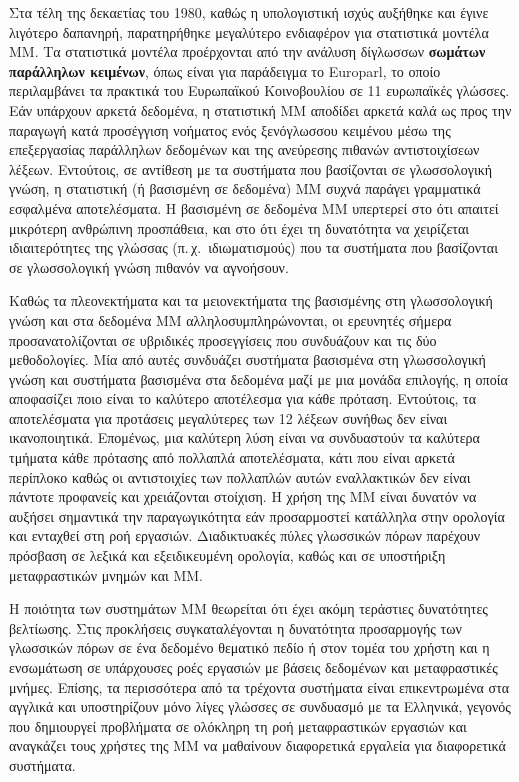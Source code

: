 \documentclass[]{../../metanetpaper}
\begin{document}
\begin{multicols}{2}
Στα τέλη της δεκαετίας του 1980, καθώς η υπολογιστική ισχύς αυξήθηκε και έγινε λιγότερο δαπανηρή, παρατηρήθηκε  μεγαλύτερο ενδιαφέρον για στατιστικά μοντέλα ΜΜ. Τα στατιστικά μοντέλα προέρχονται από την ανάλυση δίγλωσσων \textbf{σωμάτων παράλληλων κειμένων}, όπως είναι για παράδειγμα το Europarl, το οποίο περιλαμβάνει τα πρακτικά του Ευρωπαϊκού Κοινοβουλίου σε 11 ευρωπαϊκές γλώσσες. Εάν υπάρχουν αρκετά δεδομένα, η στατιστική MΜ αποδίδει αρκετά καλά ως προς την παραγωγή κατά προσέγγιση νοήματος ενός ξενόγλωσσου κειμένου μέσω της επεξεργασίας παράλληλων δεδομένων και της ανεύρεσης πιθανών αντιστοιχίσεων λέξεων. Εντούτοις, σε αντίθεση με τα συστήματα που βασίζονται σε γλωσσολογική γνώση, η στατιστική (ή βασισμένη σε δεδομένα) MΜ συχνά παράγει γραμματικά εσφαλμένα αποτελέσματα. Η βασισμένη σε δεδομένα ΜΜ υπερτερεί στο ότι απαιτεί μικρότερη ανθρώπινη προσπάθεια, και στο ότι έχει τη δυνατότητα να χειρίζεται ιδιαιτερότητες της γλώσσας (π.\,χ.~ιδιωματισμούς) που τα συστήματα που βασίζονται σε γλωσσολογική γνώση πιθανόν να αγνοήσουν.

Καθώς τα πλεονεκτήματα και τα μειονεκτήματα της βασισμένης στη γλωσσολογική γνώση και στα δεδομένα MΜ αλληλοσυμπληρώνονται, οι ερευνητές σήμερα προσανατολίζονται σε υβριδικές προσεγγίσεις που συνδυάζουν και τις δύο μεθοδολογίες. Μία από αυτές συνδυάζει συστήματα βασισμένα στη γλωσσολογική γνώση και συστήματα βασισμένα στα δεδομένα μαζί με μια μονάδα επιλογής, η οποία αποφασίζει ποιο είναι το καλύτερο αποτέλεσμα για κάθε πρόταση. Εντούτοις, τα αποτελέσματα για προτάσεις μεγαλύτερες των 12 λέξεων συνήθως δεν είναι ικανοποιητικά. Επομένως, μια καλύτερη λύση είναι να συνδυαστούν τα καλύτερα τμήματα κάθε πρότασης από πολλαπλά αποτελέσματα, κάτι που είναι αρκετά περίπλοκο καθώς οι αντιστοιχίες των πολλαπλών αυτών εναλλακτικών δεν είναι πάντοτε προφανείς και χρειάζονται στοίχιση. Η χρήση της ΜΜ είναι δυνατόν να αυξήσει σημαντικά την παραγωγικότητα εάν προσαρμοστεί κατάλληλα στην ορολογία και ενταχθεί στη ροή εργασιών. Διαδικτυακές πύλες γλωσσικών πόρων παρέχουν πρόσβαση σε λεξικά και εξειδικευμένη ορολογία, καθώς και σε υποστήριξη μεταφραστικών μνημών και ΜΜ. 

Η ποιότητα των συστημάτων MΜ θεωρείται ότι έχει ακόμη τεράστιες δυνατότητες βελτίωσης. Στις προκλήσεις συγκαταλέγονται η δυνατότητα προσαρμογής των γλωσσικών πόρων σε ένα δεδομένο θεματικό πεδίο ή στον τομέα του χρήστη και η ενσωμάτωση σε υπάρχουσες ροές εργασιών με βάσεις δεδομένων και μεταφραστικές μνήμες. Επίσης, τα περισσότερα από τα τρέχοντα συστήματα είναι επικεντρωμένα στα αγγλικά και υποστηρίζουν μόνο λίγες γλώσσες σε συνδυασμό με τα Ελληνικά, γεγονός  που δημιουργεί προβλήματα σε ολόκληρη τη ροή μεταφραστικών εργασιών και αναγκάζει τους χρήστες της MΜ να μαθαίνουν διαφορετικά εργαλεία για διαφορετικά συστήματα.


\end{multicols}
\end{document}
